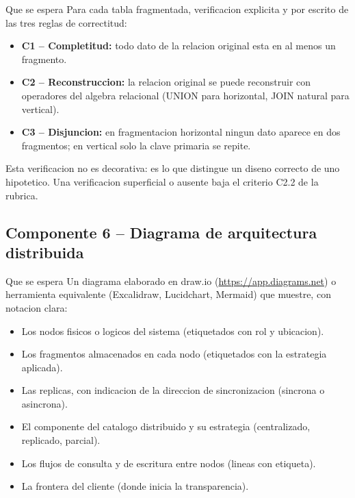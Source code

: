 \documentclass[11pt,a4paper]{article}
\begin{document}
\begin{cajadefinicion}{Que se espera}
Para cada tabla fragmentada, verificacion explicita y por escrito de las tres reglas de correctitud:
\begin{itemize}
\item \textbf{C1 -- Completitud:} todo dato de la relacion original esta en al menos un fragmento.
\item \textbf{C2 -- Reconstruccion:} la relacion original se puede reconstruir con operadores del algebra relacional (UNION para horizontal, JOIN natural para vertical).
\item \textbf{C3 -- Disjuncion:} en fragmentacion horizontal ningun dato aparece en dos fragmentos; en vertical solo la clave primaria se repite.
\end{itemize}
\end{cajadefinicion}

Esta verificacion no es decorativa: es lo que distingue un diseno correcto de uno hipotetico. Una verificacion superficial o ausente baja el criterio C2.2 de la rubrica.

\subsection{Componente 6 -- Diagrama de arquitectura distribuida}

\begin{cajadefinicion}{Que se espera}
Un diagrama elaborado en draw.io (\url{https://app.diagrams.net}) o herramienta equivalente (Excalidraw, Lucidchart, Mermaid) que muestre, con notacion clara:
\begin{itemize}
\item Los nodos fisicos o logicos del sistema (etiquetados con rol y ubicacion).
\item Los fragmentos almacenados en cada nodo (etiquetados con la estrategia aplicada).
\item Las replicas, con indicacion de la direccion de sincronizacion (sincrona o asincrona).
\item El componente del catalogo distribuido y su estrategia (centralizado, replicado, parcial).
\item Los flujos de consulta y de escritura entre nodos (lineas con etiqueta).
\item La frontera del cliente (donde inicia la transparencia).
\end{itemize}
\end{cajadefinicion}
\end{document}
